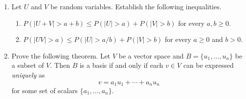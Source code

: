 \documentclass[11pt]{article}
\begin{document}
\begin{enumerate}
\item Let $U$ and $V$ be random variables.  Establish the following inequalities.
\begin{enumerate}
\item $P(|U+V| > a + b) \le P(|U| > a) + P(|V| > b)$ for every $a,b \ge 0$.
\item $P(|UV| > a) \le P(|U| > a/b) + P(|V| > b)$ for every $a \ge 0$ and $b > 0$.
\end{enumerate}

\item Prove the following theorem.  Let $V$ be a vector space and $B = \{u_{1},\dots,u_{n}\}$ be a subset of $V$.  Then $B$ is a basis if and only if each $v \in V$ can be expressed \textit{uniquely} as 
\[
v = a_{1}u_{1} + \cdots + a_{n}u_{n}
\] 
for some set of scalars $\{a_{1},\dots,a_{n}\}$.

\end{enumerate}
\end{document}
